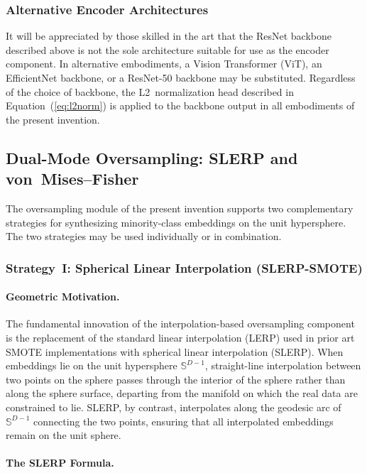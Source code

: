 \documentclass[12pt,letterpaper]{article}
\newcommand{\Sphere}{\mathbb{S}}
\begin{document}
\subsubsection{Alternative Encoder Architectures}

It will be appreciated by those skilled in the art that the ResNet backbone
described above is not the sole architecture suitable for use as the encoder
component.  In alternative embodiments, a Vision Transformer (ViT), an
EfficientNet backbone, or a ResNet-50 backbone may be substituted.
Regardless of the choice of backbone, the L2~normalization head described in
Equation~(\ref{eq:l2norm}) is applied to the backbone output in all
embodiments of the present invention.

\subsection{Dual-Mode Oversampling: SLERP and von~Mises--Fisher}

The oversampling module of the present invention supports two complementary
strategies for synthesizing minority-class embeddings on the unit hypersphere.
The two strategies may be used individually or in combination.

\subsubsection{Strategy~I: Spherical Linear Interpolation (SLERP-SMOTE)}

\paragraph{Geometric Motivation.}

The fundamental innovation of the interpolation-based oversampling component
is the replacement of the standard linear interpolation (LERP) used in prior
art SMOTE implementations with spherical linear interpolation (SLERP).  When
embeddings lie on the unit hypersphere $\Sphere^{D-1}$, straight-line
interpolation between two points on the sphere passes through the interior
of the sphere rather than along the sphere surface, departing from the
manifold on which the real data are constrained to lie.  SLERP, by contrast,
interpolates along the geodesic arc of $\Sphere^{D-1}$ connecting the two
points, ensuring that all interpolated embeddings remain on the unit sphere.

\paragraph{The SLERP Formula.}
\end{document}
